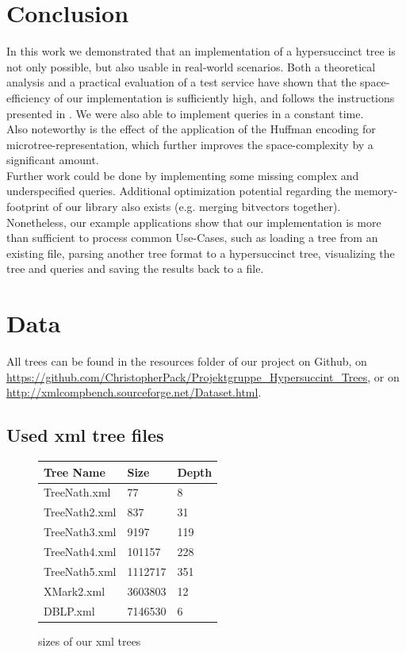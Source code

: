\documentclass{article}
\begin{document}
\section{Conclusion} \label{Conclusion}
In this work we demonstrated that an implementation of a hypersuccinct tree is not only possible, but also usable in real-world scenarios. Both a theoretical analysis and a practical evaluation of a test service have shown that the space-efficiency of our implementation is sufficiently high, and follows the instructions presented in \cite{farzanMunro}. We were also able to implement queries in a constant time.\\
Also noteworthy is the effect of the application of the Huffman encoding for microtree-representation, which further improves the space-complexity by a significant amount.\\
Further work could be done by implementing some missing complex and underspecified queries. Additional optimization potential regarding the memory-footprint of our library also exists (e.g. merging bitvectors together).\\
Nonetheless, our example applications show that our implementation is more than sufficient to process common Use-Cases, such as loading a tree from an existing file, parsing another tree format to a hypersuccinct tree, visualizing the tree and queries and saving the results back to a file.

\pagebreak
\section{Data}  \label{Data}
All trees can be found in the resources folder of our project on Github, on \href{https://github.com/ChristopherPack/Projektgruppe\_Hypersuccint\_Trees}{https://github.com/ChristopherPack/Projektgruppe\_Hypersuccint\_Trees}, or on \href{http://xmlcompbench.sourceforge.net/Dataset.html}{http://xmlcompbench.sourceforge.net/Dataset.html}.
\subsection{Used xml tree files}
\begin{figure}[H]
	\begin{tabular}{ |p{3cm}||p{}||p{}| }
		 \hline
		 Tree Name & Size & Depth\\
		 \hline
		 TreeNath.xml   &77 & 8\\
		 TreeNath2.xml&  837 & 31\\
		 TreeNath3.xml&9197 & 119\\
		 TreeNath4.xml&101157 & 228\\
		 TreeNath5.xml&1112717 & 351\\
		 XMark2.xml&3603803 & 12\\
		 DBLP.xml&7146530 & 6\\
		 \hline
	\end{tabular}
\caption{sizes of our xml trees}
\label{data:table1}
\end{figure}
\end{document}
